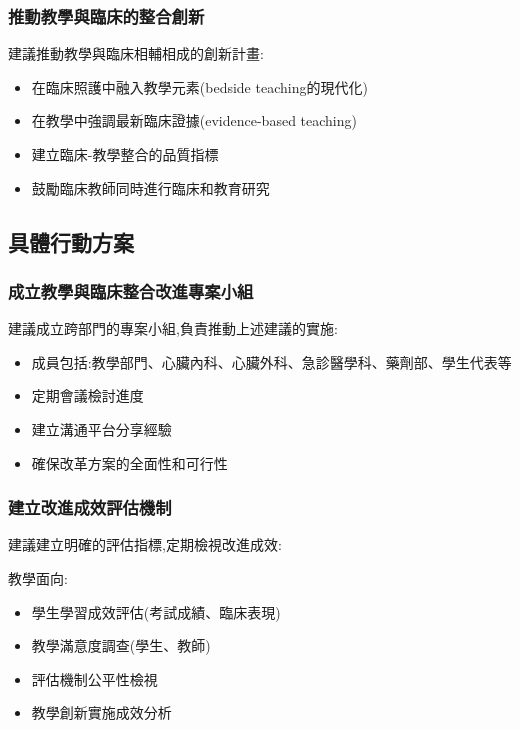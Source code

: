 \documentclass[12pt,a4paper]{article}
\begin{document}
\subsubsection{推動教學與臨床的整合創新}

建議推動教學與臨床相輔相成的創新計畫:
\begin{itemize}[nosep]
    \item 在臨床照護中融入教學元素(bedside teaching的現代化)
    \item 在教學中強調最新臨床證據(evidence-based teaching)
    \item 建立臨床-教學整合的品質指標
    \item 鼓勵臨床教師同時進行臨床和教育研究
\end{itemize}

\subsection{具體行動方案}

\subsubsection{成立教學與臨床整合改進專案小組}

建議成立跨部門的專案小組,負責推動上述建議的實施:
\begin{itemize}[nosep]
    \item 成員包括:教學部門、心臟內科、心臟外科、急診醫學科、藥劑部、學生代表等
    \item 定期會議檢討進度
    \item 建立溝通平台分享經驗
    \item 確保改革方案的全面性和可行性
\end{itemize}

\subsubsection{建立改進成效評估機制}

建議建立明確的評估指標,定期檢視改進成效:

教學面向:
\begin{itemize}[nosep]
    \item 學生學習成效評估(考試成績、臨床表現)
    \item 教學滿意度調查(學生、教師)
    \item 評估機制公平性檢視
    \item 教學創新實施成效分析
\end{itemize}
\end{document}
